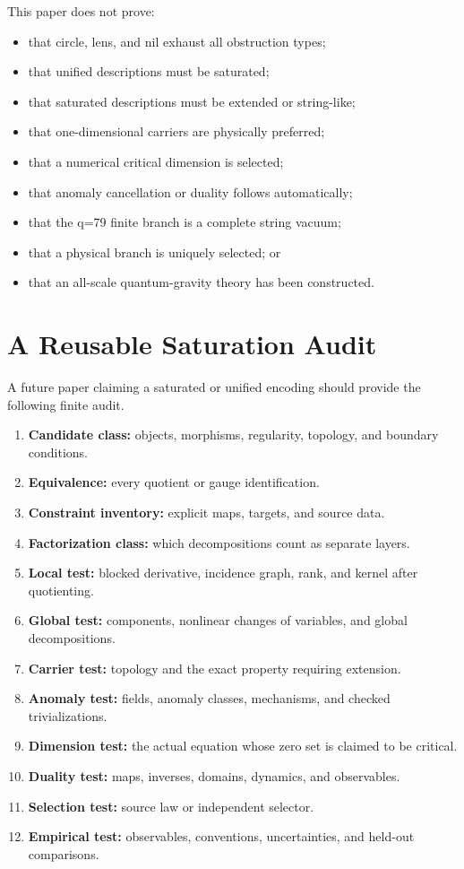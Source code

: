 \documentclass[11pt]{article}
\begin{document}
This paper does not prove:
\begin{itemize}
\item that circle, lens, and nil exhaust all obstruction types;
\item that unified descriptions must be saturated;
\item that saturated descriptions must be extended or string-like;
\item that one-dimensional carriers are physically preferred;
\item that a numerical critical dimension is selected;
\item that anomaly cancellation or duality follows automatically;
\item that the q=79 finite branch is a complete string vacuum;
\item that a physical branch is uniquely selected; or
\item that an all-scale quantum-gravity theory has been constructed.
\end{itemize}

\section{A Reusable Saturation Audit}

A future paper claiming a saturated or unified encoding should provide the
following finite audit.

\begin{enumerate}
\item \textbf{Candidate class:} objects, morphisms, regularity, topology, and
boundary conditions.
\item \textbf{Equivalence:} every quotient or gauge identification.
\item \textbf{Constraint inventory:} explicit maps, targets, and source data.
\item \textbf{Factorization class:} which decompositions count as separate
layers.
\item \textbf{Local test:} blocked derivative, incidence graph, rank, and
kernel after quotienting.
\item \textbf{Global test:} components, nonlinear changes of variables, and
global decompositions.
\item \textbf{Carrier test:} topology and the exact property requiring
extension.
\item \textbf{Anomaly test:} fields, anomaly classes, mechanisms, and checked
trivializations.
\item \textbf{Dimension test:} the actual equation whose zero set is claimed
to be critical.
\item \textbf{Duality test:} maps, inverses, domains, dynamics, and observables.
\item \textbf{Selection test:} source law or independent selector.
\item \textbf{Empirical test:} observables, conventions, uncertainties, and
held-out comparisons.
\end{enumerate}
\end{document}
